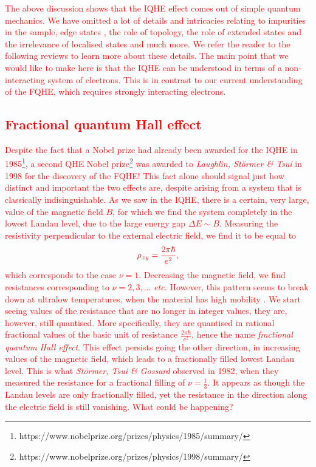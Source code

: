  \textcolor{red}{The above discussion shows that the IQHE effect comes out of simple quantum mechanics. We have omitted a lot of details and intricacies relating to impurities in the sample, edge states \cite{PhysRevB.25.2185}, the role of topology, the role of extended states and the irrelevance of locali\textcolor{red}{s}ed states \cite{PhysRevB.23.5632} and much more. We refer the reader to the following reviews \cite{Tong:2016kpv, yoshioka2002the, Girvin} to learn more about these details. The main point that we would like to make here is that the IQHE can be understood in terms of a non-interacting system of electrons. This is in contrast to our current understanding of the FQHE, which requires strongly interacting electrons.}


 \textcolor{red}{\subsection{Fractional quantum Hall effect}}

 \textcolor{red}{Despite the fact that a Nobel prize had already been awarded for the IQHE in 1985\footnote[1]{https://www.nobelprize.org/prizes/physics/1985/summary/}, a second QHE Nobel prize\footnote[2]{https://www.nobelprize.org/prizes/physics/1998/summary/} was awarded to \textit{Laughlin, Störmer \& Tsui} \cite{Laughlin:1983fy, PhysRevLett.48.1559} in 1998 for the discovery of the FQHE! This fact alone should signal just how distinct and important the two effects are, despite arising from a system that is classically indisinguishable. As we saw in the IQHE, there is a certain, very large, value of the magnetic field $B$, for which we find the system completely in the lowest Landau level, due to the large energy gap $\Delta E \sim B$. Measuring the resistivity perpendicular to the external electric field, we find it to be equal to}
\begin{align}
    \textcolor{red}{ \rho_{x y} = \frac{2\pi\hbar}{e^2},}
\end{align}
 \textcolor{red}{ which corresponds to the case $\nu=1$. Decreasing the magnetic field, we find resistances corresponding to $\nu=2,3,...$ \textit{etc.} However, this pattern seems to break down at ultralow temperatures, when the material has high mobility \cite{yoshioka2002the}. We start seeing values of the resistance that are  no longer in integer values, they are, however, still quanti\textcolor{red}{s}ed.  More specifically, they are quanti\textcolor{red}{s}ed in rational fractional values of the basic unit of resistance $\frac{2 \pi\hbar}{e^2}$, hence the name \textit{fractional quantum Hall effect}. This effect persists going the other direction, in increasing values of the magnetic field, which leads to a fractionally filled lowest Landau level. This is what \textit{Störmer, Tsui \& Gossard} \cite{PhysRevLett.48.1559} observed in 1982, when they measured the resistance for a fractional filling of $\nu=\frac{1}{3}$. It appears as though the Landau levels are only fractionally filled, yet the resistance in the direction along the electric field is still vanishing. What could be happening?}

